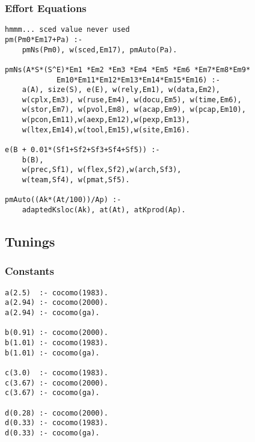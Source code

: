 \subsubsection{ Effort Equations }\begin{Verbatim}
hmmm... sced value never used
pm(Pm0*Em17+Pa) :-
	pmNs(Pm0), w(sced,Em17), pmAuto(Pa).

pmNs(A*S*(S^E)*Em1 *Em2 *Em3 *Em4 *Em5 *Em6 *Em7*Em8*Em9*
            Em10*Em11*Em12*Em13*Em14*Em15*Em16) :-
	a(A), size(S), e(E), w(rely,Em1), w(data,Em2),
	w(cplx,Em3), w(ruse,Em4), w(docu,Em5), w(time,Em6),
	w(stor,Em7), w(pvol,Em8), w(acap,Em9), w(pcap,Em10),
	w(pcon,Em11),w(aexp,Em12),w(pexp,Em13),
	w(ltex,Em14),w(tool,Em15),w(site,Em16).

e(B + 0.01*(Sf1+Sf2+Sf3+Sf4+Sf5)) :-
	b(B), 
	w(prec,Sf1), w(flex,Sf2),w(arch,Sf3),
	w(team,Sf4), w(pmat,Sf5).

pmAuto((Ak*(At/100))/Ap) :-
	adaptedKsloc(Ak), at(At), atKprod(Ap).
\end{Verbatim}

\subsection{ Tunings 
}
\subsubsection{ Constants }\begin{Verbatim}
a(2.5)  :- cocomo(1983).
a(2.94) :- cocomo(2000).
a(2.94) :- cocomo(ga).

b(0.91) :- cocomo(2000).
b(1.01) :- cocomo(1983).
b(1.01) :- cocomo(ga).

c(3.0)  :- cocomo(1983).
c(3.67) :- cocomo(2000).
c(3.67) :- cocomo(ga).

d(0.28) :- cocomo(2000).
d(0.33) :- cocomo(1983).
d(0.33) :- cocomo(ga).
\end{Verbatim}
